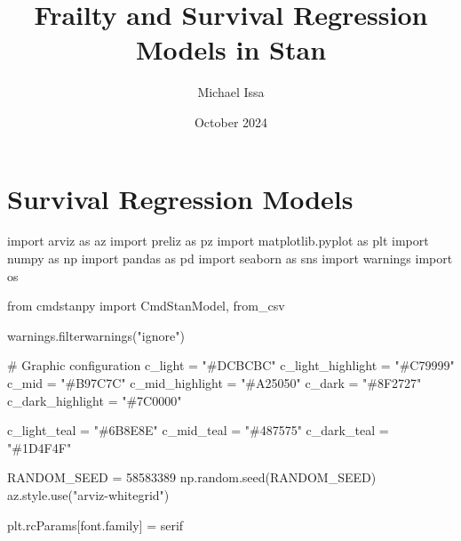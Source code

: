 \documentclass[
  letterpaper,
  DIV=11,
  numbers=noendperiod]{scrartcl}
\title{Frailty and Survival Regression Models in Stan}
\author{Michael Issa}
\date{October 2024}
\newenvironment{Shaded}{\begin{snugshade}}{\end{snugshade}}
\newcommand{\CommentTok}[1]{\textcolor[rgb]{0.37,0.37,0.37}{#1}}
\newcommand{\DecValTok}[1]{\textcolor[rgb]{0.68,0.00,0.00}{#1}}
\newcommand{\ImportTok}[1]{\textcolor[rgb]{0.00,0.46,0.62}{#1}}
\newcommand{\NormalTok}[1]{\textcolor[rgb]{0.00,0.23,0.31}{#1}}
\newcommand{\OperatorTok}[1]{\textcolor[rgb]{0.37,0.37,0.37}{#1}}
\newcommand{\StringTok}[1]{\textcolor[rgb]{0.13,0.47,0.30}{#1}}
\renewcommand*\contentsname{Table of contents}
\newcommand\contentsname{Table of contents}
\begin{document}
\maketitle

\renewcommand*\contentsname{Table of contents}
{
\hypersetup{linkcolor=}
\setcounter{tocdepth}{3}
\tableofcontents
}
\section{Survival Regression Models}\label{survival-regression-models}

\begin{Shaded}
\begin{Highlighting}[]
\ImportTok{import}\NormalTok{ arviz }\ImportTok{as}\NormalTok{ az}
\ImportTok{import}\NormalTok{ preliz }\ImportTok{as}\NormalTok{ pz}
\ImportTok{import}\NormalTok{ matplotlib.pyplot }\ImportTok{as}\NormalTok{ plt}
\ImportTok{import}\NormalTok{ numpy }\ImportTok{as}\NormalTok{ np}
\ImportTok{import}\NormalTok{ pandas }\ImportTok{as}\NormalTok{ pd}
\ImportTok{import}\NormalTok{ seaborn }\ImportTok{as}\NormalTok{ sns}
\ImportTok{import}\NormalTok{ warnings}
\ImportTok{import}\NormalTok{ os}

\ImportTok{from}\NormalTok{ cmdstanpy }\ImportTok{import}\NormalTok{ CmdStanModel, from\_csv}

\NormalTok{warnings.filterwarnings(}\StringTok{"ignore"}\NormalTok{)}

\CommentTok{\# Graphic configuration}
\NormalTok{c\_light }\OperatorTok{=} \StringTok{"\#DCBCBC"}
\NormalTok{c\_light\_highlight }\OperatorTok{=} \StringTok{"\#C79999"}
\NormalTok{c\_mid }\OperatorTok{=} \StringTok{"\#B97C7C"}
\NormalTok{c\_mid\_highlight }\OperatorTok{=} \StringTok{"\#A25050"}
\NormalTok{c\_dark }\OperatorTok{=} \StringTok{"\#8F2727"}
\NormalTok{c\_dark\_highlight }\OperatorTok{=} \StringTok{"\#7C0000"}

\NormalTok{c\_light\_teal }\OperatorTok{=} \StringTok{"\#6B8E8E"}
\NormalTok{c\_mid\_teal }\OperatorTok{=} \StringTok{"\#487575"}
\NormalTok{c\_dark\_teal }\OperatorTok{=} \StringTok{"\#1D4F4F"}

\NormalTok{RANDOM\_SEED }\OperatorTok{=} \DecValTok{58583389}
\NormalTok{np.random.seed(RANDOM\_SEED)}
\NormalTok{az.style.use(}\StringTok{"arviz{-}whitegrid"}\NormalTok{)}

\NormalTok{plt.rcParams[}\StringTok{\textquotesingle{}font.family\textquotesingle{}}\NormalTok{] }\OperatorTok{=} \StringTok{\textquotesingle{}serif\textquotesingle{}}


\end{Highlighting}
\end{Shaded}
\end{document}
